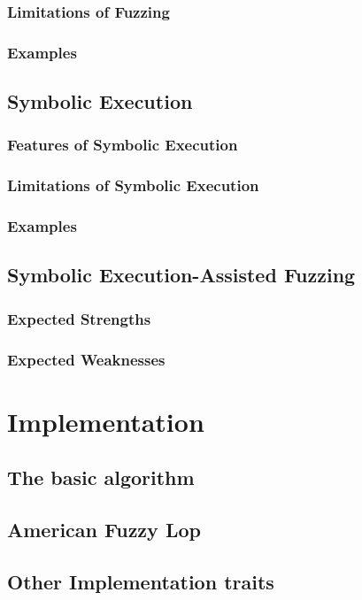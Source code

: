 \documentclass[a4paper]{article}
\begin{document}
\subsubsection*{Limitations of Fuzzing}
\subsubsection*{Examples}

\subsection{Symbolic Execution}
\subsubsection*{Features of Symbolic Execution}
\subsubsection*{Limitations of Symbolic Execution}
\subsubsection*{Examples}

\subsection{Symbolic Execution-Assisted Fuzzing}
\subsubsection*{Expected Strengths}
\subsubsection*{Expected Weaknesses}

\section{Implementation}
\subsection{The basic algorithm}
\subsection{American Fuzzy Lop}
\subsection{Other Implementation traits}
\end{document}
